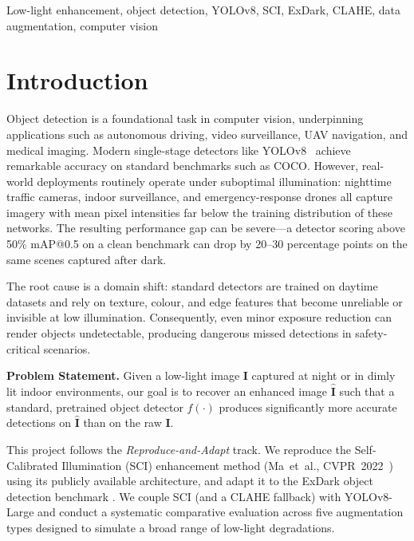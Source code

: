 \documentclass[conference]{IEEEtran}
\begin{document}
\begin{IEEEkeywords}
Low-light enhancement, object detection, YOLOv8, SCI, ExDark, CLAHE,
data augmentation, computer vision
\end{IEEEkeywords}

\section{Introduction}
\label{sec:intro}

Object detection is a foundational task in computer vision, underpinning
applications such as autonomous driving, video surveillance, UAV
navigation, and medical imaging. Modern single-stage detectors like
YOLOv8~\cite{jocher2023yolo} achieve remarkable accuracy on
standard benchmarks such as COCO. However, real-world deployments
routinely operate under suboptimal illumination: nighttime traffic
cameras, indoor surveillance, and emergency-response drones all capture
imagery with mean pixel intensities far below the training distribution
of these networks. The resulting performance gap can be severe---a
detector scoring above 50\% mAP@0.5 on a clean benchmark can drop by
20--30 percentage points on the same scenes captured after dark.

The root cause is a domain shift: standard detectors are trained on
daytime datasets and rely on texture, colour, and edge features that
become unreliable or invisible at low illumination. Consequently, even
minor exposure reduction can render objects undetectable, producing
dangerous missed detections in safety-critical scenarios.

\textbf{Problem Statement.}
Given a low-light image $\mathbf{I}$ captured at night or in dimly lit
indoor environments, our goal is to recover an enhanced image
$\hat{\mathbf{I}}$ such that a standard, pretrained object detector
$f(\cdot)$ produces significantly more accurate detections on
$\hat{\mathbf{I}}$ than on the raw $\mathbf{I}$.

This project follows the \emph{Reproduce-and-Adapt} track. We reproduce
the Self-Calibrated Illumination (SCI) enhancement method
(Ma~et~al., CVPR~2022~\cite{ma2022sci}) using its publicly available
architecture, and adapt it to the ExDark object detection benchmark
\cite{loh2019exdark}. We couple SCI (and a CLAHE fallback) with
YOLOv8-Large and conduct a systematic comparative evaluation across five
augmentation types designed to simulate a broad range of low-light
degradations.
\end{document}
